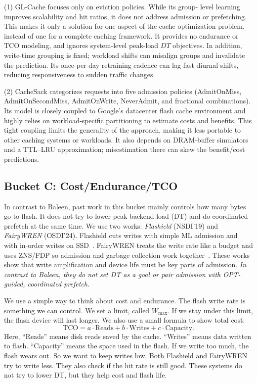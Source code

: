 (1) GL-Cache focuses only on eviction policies. While its group-
level learning improves scalability and hit ratios, it does not address
admission or prefetching. This makes it only a solution for one
aspect of the cache optimization problem, instead of one for a
complete caching framework. It provides no endurance or TCO modeling, and ignores system-level peak-load \(DT\) objectives. In addition, write-time grouping is fixed; workload shifts can misalign groups and invalidate the prediction. Its once-per-day retraining cadence can lag fast diurnal shifts, reducing responsiveness to sudden traffic changes.


(2) CacheSack categorizes requests into five admission policies (AdmitOnMiss, AdmitOnSecondMiss, AdmitOnWrite, NeverAdmit, and fractional combinations). Its model is closely coupled to Google’s datacenter flash cache environment and highly relies on workload-specific partitioning to estimate costs and benefits. This tight coupling limits the generality of the approach, making it less portable to other caching systems or workloads. It also depends on DRAM-buffer simulators and a TTL–LRU approximation; misestimation there can skew the benefit/cost predictions. 


\subsection{Bucket C: Cost/Endurance/TCO}

In contrast to Baleen, past work in this bucket mainly controls how many bytes go to flash. It does not try to lower peak backend load (DT) and do coordinated prefetch at the same time. We use two works: \emph{Flashield} (NSDI'19) and \emph{FairyWREN} (OSDI'24). Flashield cuts writes with simple ML admission and with in-order writes on SSD~\cite{nsdi19-flashield}. FairyWREN treats the write rate like a budget and uses ZNS/FDP so admission and garbage collection work together~\cite{osdi24-fairywren}. These works show that write amplification and device life must be key parts of admission. \textit{In contrast to Baleen, they do not set DT as a goal or pair admission with OPT-guided, coordinated prefetch.}


We use a simple way to think about cost and endurance. The flash write rate is something we can control. We set a limit, called $W_{\max}$. If we stay under this limit, the flash device will last longer. We also use a small formula to show total cost:
\[
\mathrm{TCO} = a \cdot \mathrm{Reads} + b \cdot \mathrm{Writes} + c \cdot \mathrm{Capacity}.
\]
Here, “Reads” means disk reads saved by the cache. “Writes” means data written to flash. “Capacity” means the space used in the flash. If we write too much, the flash wears out. So we want to keep writes low. Both Flashield and FairyWREN try to write less. They also check if the hit rate is still good. These systems do not try to lower DT, but they help cost and flash life.


